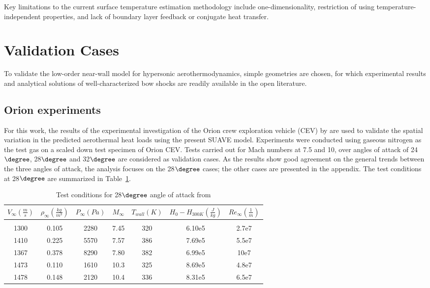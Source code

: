 \documentclass[%
 aip,
 amsmath,amssymb,
preprint,%
]{revtex4-1}
\begin{document}
Key limitations to the current surface temperature estimation methodology include one-dimensionality, restriction of using temperature-independent properties, and lack of boundary layer feedback or conjugate heat transfer.



\section{Validation Cases}

To validate the low-order near-wall model for hypersonic aerothermodynamics, simple geometries are chosen, for which experimental results and analytical solutions of well-characterized bow shocks are readily available in the open literature. %

\subsection{Orion experiments}

For this work, the results of the experimental investigation of the Orion crew exploration vehicle (CEV) by \cite{hollis_aeroheating_2009} are used to validate the spatial variation in the predicted aerothermal heat loads using the present SUAVE model. Experiments were conducted using gaseous nitrogen as the test gas on a scaled down test specimen of Orion CEV. Tests carried out for Mach numbers at 7.5 and 10, over angles of attack of 24$\degree$, 28$\degree$ and 32$\degree$ are considered as validation cases. As the results show good agreement on the general trends between the three angles of attack, the analysis focuses on the 28$\degree$ cases; the other cases are presented in the appendix. The test conditions at 28$\degree$ are summarized in Table~\ref{hollis_test_inputs}. 

\begin{table}[hbt]
\caption{Test conditions for 28$\degree$ angle of attack from \cite{hollis_aeroheating_2009}}
\label{hollis_test_inputs}
\begin{center}
\begin{tabular}{c c c c c c c}
 \textbf{$V_\infty(\frac{m}{s})$} & \textbf{$\rho_\infty (\frac{kg}{m^{3}})$} & \textbf{$P_\infty (Pa)$} & \textbf{$M_\infty$} & \textbf{$T_{wall} (K)$} & \textbf{$H_0 - H_{300K} (\frac{J}{kg})$} & \textbf{$Re_\infty (\frac{1}{m})$}\\ 
\hline\\
1300 & 0.105 & 2280 & 7.45  & 320  & 6.10e5 & 2.7e7 \\
 1410 & 0.225 & 5570 & 7.57 & 386  & 7.69e5  & 5.5e7 \\
 1367 & 0.378 & 8290 & 7.80 & 382  & 6.99e5  & 10e7 \\
 1473 & 0.110 & 1610 & 10.3 & 325  & 8.69e5  & 4.8e7 \\
 1478 & 0.148 & 2120 & 10.4 & 336  & 8.31e5  & 6.5e7 \\
\end{tabular}
\end{center}
\end{table}
\end{document}

